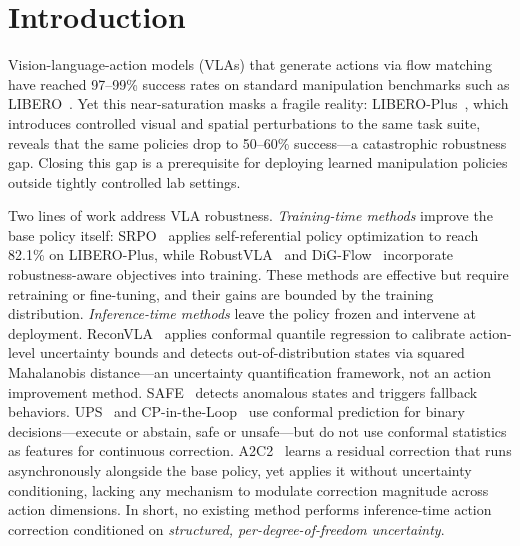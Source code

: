 \section{Introduction}
\label{sec:intro}

Vision-language-action models (VLAs) that generate actions via flow matching~\cite{black2024pi0,shukor2025smolvla} have reached 97--99\% success rates on standard manipulation benchmarks such as LIBERO~\cite{liu2023libero}.
Yet this near-saturation masks a fragile reality: LIBERO-Plus~\cite{fei2025liberoplus}, which introduces controlled visual and spatial perturbations to the same task suite, reveals that the same policies drop to 50--60\% success---a catastrophic robustness gap.
Closing this gap is a prerequisite for deploying learned manipulation policies outside tightly controlled lab settings.

Two lines of work address VLA robustness.
\emph{Training-time methods} improve the base policy itself: SRPO~\cite{srpo2025} applies self-referential policy optimization to reach 82.1\% on LIBERO-Plus, while RobustVLA~\cite{robustvla2025} and DiG-Flow~\cite{digflow2025} incorporate robustness-aware objectives into training.
These methods are effective but require retraining or fine-tuning, and their gains are bounded by the training distribution.
\emph{Inference-time methods} leave the policy frozen and intervene at deployment.
ReconVLA~\cite{chen2026reconvla} applies conformal quantile regression to calibrate action-level uncertainty bounds and detects out-of-distribution states via squared Mahalanobis distance---an uncertainty quantification framework, not an action improvement method.
SAFE~\cite{gu2025safe} detects anomalous states and triggers fallback behaviors.
UPS~\cite{yuan2026ups} and CP-in-the-Loop~\cite{wang2025cploop} use conformal prediction for binary decisions---execute or abstain, safe or unsafe---but do not use conformal statistics as features for continuous correction.
A2C2~\cite{a2c2_2025} learns a residual correction that runs asynchronously alongside the base policy, yet applies it without uncertainty conditioning, lacking any mechanism to modulate correction magnitude across action dimensions.
In short, no existing method performs inference-time action correction conditioned on \emph{structured, per-degree-of-freedom uncertainty}.


